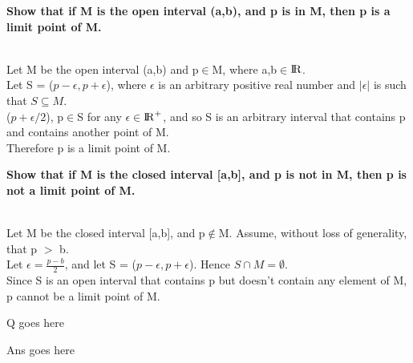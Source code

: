 \documentclass[answers]{exam}
\begin{document}

\begin{questions}
\question
   \textbf{ Show that if M is the open interval (a,b), and p is in M, then p is a limit point of M.}

\begin{solution}\\
   Let M be the open interval (a,b) and p$\in$M, where a,b$\in$${\rm I\!R}$. \\
  Let S = ($p-\epsilon, p+\epsilon$), where $\epsilon$ is an arbitrary positive real number and $|\epsilon|$ is such that $S \subseteq M$. \\
($p+\epsilon / 2$), p$\in$S for any $\epsilon$$\in$${\rm I\!R}^+$, and so S is an arbitrary interval that contains p and contains another point of M. \\
Therefore p is a limit point of M.
\end{solution}


\question

\textbf{Show that if M is the closed interval [a,b], and p is not in M, then p is not a limit point of M.}

\begin{solution}\\
    Let M be the closed interval [a,b], and p$\notin$M. Assume, without loss of generality, that p $>$ b.\\ 
Let $\epsilon = \frac{p-b}{2}$, and let S = ($p-\epsilon, p+\epsilon$). Hence $S \cap M = \emptyset$. \\ 
Since S is an open interval that contains p but doesn't contain any element of M, p cannot be a limit point of M.
\end{solution}



\question

Q goes here

\begin{solution}
   Ans goes here
\end{solution}

\end{questions}
\end{document}

